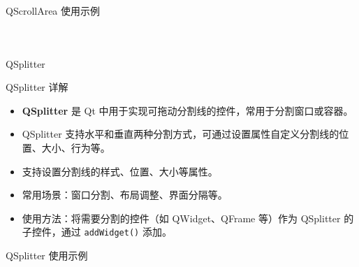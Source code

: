 \documentclass[UTF8,aspectratio=169]{beamer}
\begin{document}
\begin{frame}[fragile]{QScrollArea 使用示例}
    \begin{columns}
        \begin{column}{0.48\textwidth}
            \inputminted[firstline=1,lastline=21]{cpp}{code/qt_scrollarea_example.cpp}
        \end{column}
        \begin{column}{0.48\textwidth}
            \inputminted[firstline=22,lastline=40]{cpp}{code/qt_scrollarea_example.cpp}
        \end{column}
    \end{columns}
\end{frame}

\begin{frame}{QSplitter}
    \begin{ytublock}{QSplitter 详解}
        \begin{itemize}
            \item \textbf{QSplitter} 是 Qt 中用于实现可拖动分割线的控件，常用于分割窗口或容器。
            \item QSplitter 支持水平和垂直两种分割方式，可通过设置属性自定义分割线的位置、大小、行为等。
            \item 支持设置分割线的样式、位置、大小等属性。
            \item 常用场景：窗口分割、布局调整、界面分隔等。
            \item 使用方法：将需要分割的控件（如 QWidget、QFrame 等）作为 QSplitter 的子控件，通过 \texttt{addWidget()} 添加。
        \end{itemize}
    \end{ytublock}
\end{frame}

\begin{frame}[fragile]{QSplitter 使用示例}
    \begin{columns}
        \begin{column}{0.48\textwidth}
            \inputminted[firstline=1,lastline=15]{cpp}{code/qt_splitter_example.cpp}
        \end{column}
        \begin{column}{0.48\textwidth}
            \inputminted[firstline=16,lastline=31]{cpp}{code/qt_splitter_example.cpp}
        \end{column}
    \end{columns}
\end{frame}
\end{document}
